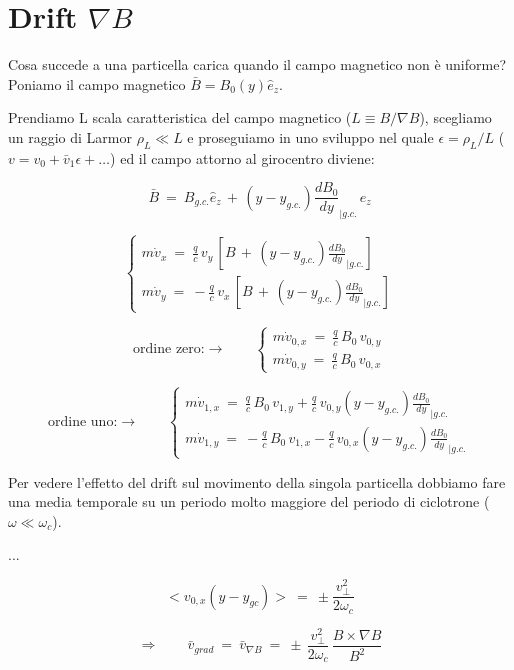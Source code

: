 \section{Drift $\nabla B$}

Cosa succede a una particella carica quando il campo magnetico non è uniforme? Poniamo il campo magnetico $\bar B = B_0 (y) \hat e_z$.

Prendiamo L scala caratteristica del campo magnetico ($L\equiv B/\nabla B$), scegliamo un raggio di Larmor $\rho_L \ll L$ e proseguiamo in uno sviluppo nel quale $\epsilon = \rho_L / L$ ($v=v_0 + \bar v_1 \epsilon + \dots$) ed il campo attorno al girocentro diviene:

\[ \bar B\ =\ B_{g.c.} \hat e_z\, +\, (y-y_{g.c.}) \frac{d B_0}{dy}_{|g.c.}\, \hat e_z \]

\[\begin{cases}
	m \dot v_x\ =\ \frac{q}{c}\, v_y\,\left[B\, +\, (y-y_{g.c.}) \frac{d B_0}{dy}_{|g.c.}\right]\\
	m \dot v_y\ =\ -\frac{q}{c}\, v_x\,\left[B\, +\, (y-y_{g.c.}) \frac{d B_0}{dy}_{|g.c.}\right]
\end{cases}\]

\[\text{ordine zero:} \rightarrow \qquad 
\begin{cases}
	m \dot v_{0,x}\ =\ \frac{q}{c}\, B_0\, v_{0,y}\\
	m \dot v_{0,y}\ =\ \frac{q}{c}\, B_0\, v_{0,x}
\end{cases}\]

\[\text{ordine uno:} \rightarrow \qquad 
\begin{cases}
	m \dot v_{1,x}\ =\ \frac{q}{c}\, B_0\, v_{1,y}+\frac{q}{c}\, v_{0,y}(y-y_{g.c.}) \frac{d B_0}{dy}_{|g.c.}\\
	m \dot v_{1,y}\ =\ - \frac{q}{c}\, B_0\, v_{1,x} - \frac{q}{c}\, v_{0,x}(y-y_{g.c.}) \frac{d B_0}{dy}_{|g.c.}
\end{cases}\]

Per vedere l'effetto del drift sul movimento della singola particella dobbiamo fare una media temporale su un periodo molto maggiore del periodo di ciclotrone ($\omega \ll \omega_c$).

...

\[<v_{0,x}(y-y_{gc})>\ =\ \pm \frac{v^2_{\perp}}{2\omega_c}\]

\[\Rightarrow  \qquad 
\bar v_{grad}\ =\ \bar v_{\nabla B}\ =\ \pm\, \frac{v^2_{\perp}}{2\omega_c}\, \frac{B\times \nabla B}{B^2}\]






















 